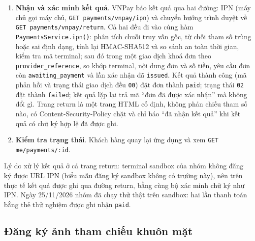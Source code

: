 \begin{enumerate}
  \item \textbf{Nhận và xác minh kết quả}. VNPay báo kết quả qua hai đường: IPN (máy chủ gọi máy chủ, \texttt{GET payments/\allowbreak{}vnpay/\allowbreak{}ipn}) và chuyển hướng trình duyệt về \texttt{GET payments/\allowbreak{}vnpay/\allowbreak{}return}. Cả hai đều đi vào cùng hàm \texttt{Payments\allowbreak{}Service.\allowbreak{}ipn()}: phân tích chuỗi truy vấn gốc, từ chối tham số trùng hoặc sai định dạng, tính lại HMAC-SHA512 và so sánh an toàn thời gian, kiểm tra mã terminal; sau đó trong một giao dịch khoá đơn theo \texttt{provider\_\allowbreak{}reference}, so khớp terminal, nội dung đơn và số tiền, yêu cầu đơn còn \texttt{awaiting\_\allowbreak{}payment} và lần xác nhận đã \texttt{issued}. Kết quả thành công (mã phản hồi và trạng thái giao dịch đều \texttt{00}) đặt đơn thành \texttt{paid}; trạng thái \texttt{02} đặt thành \texttt{failed}; kết quả lặp lại trả mã ``đơn đã được xác nhận'' mà không đổi gì. Trang return là một trang HTML cố định, không phản chiếu tham số nào, có Content-Security-Policy chặt và chỉ báo ``đã nhận kết quả'' khi kết quả có chữ ký hợp lệ đã được ghi.
  \item \textbf{Kiểm tra trạng thái}. Khách hàng quay lại ứng dụng và xem \texttt{GET me/\allowbreak{}payments/\allowbreak{}:id}.
\end{enumerate}
Lý do xử lý kết quả ở cả trang return: terminal sandbox của nhóm không đăng ký được URL IPN (biểu mẫu đăng ký sandbox không có trường này), nên trên thực tế kết quả được ghi qua đường return, bằng cùng bộ xác minh chữ ký như IPN. Ngày 25/11/2026 nhóm đã chạy thử thật trên sandbox: hai lần thanh toán bằng thẻ thử nghiệm được ghi nhận \texttt{paid}.

\subsection{Đăng ký ảnh tham chiếu khuôn mặt}
\label{sec:ch2-flow-reference}

